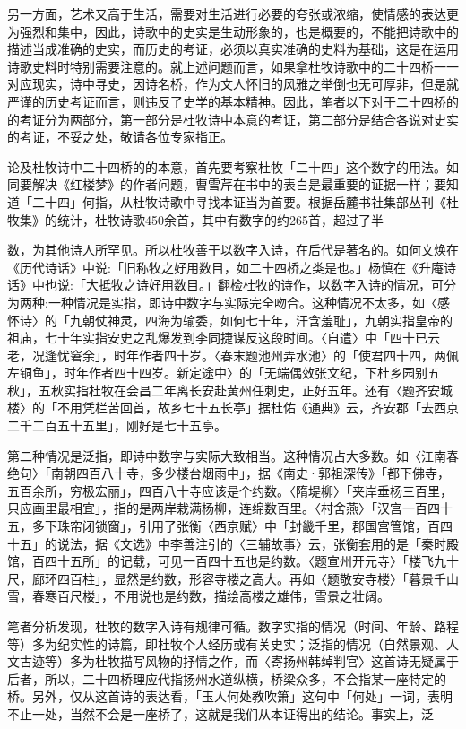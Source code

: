 另一方面，艺术又高于生活，需要对生活进行必要的夸张或浓缩，使情感的表达更为强烈和集中，因此，诗歌中的史实是生动形象的，也是概要的，不能把诗歌中的描述当成准确的史实，而历史的考证，必须以真实准确的史料为基础，这是在运用诗歌史料时特别需要注意的。就上述问题而言，如果拿杜牧诗歌中的二十四桥一一对应现实，诗中寻史，因诗名桥，作为文人怀旧的风雅之举倒也无可厚非，但是就严谨的历史考证而言，则违反了史学的基本精神。因此，笔者以下对于二十四桥的的考证分为两部分，第一部分是杜牧诗中本意的考证，第二部分是结合各说对史实的考证，不妥之处，敬请各位专家指正。


论及杜牧诗中二十四桥的的本意，首先要考察杜牧「二十四」这个数字的用法。如同要解决《红楼梦》的作者问题，曹雪芹在书中的表白是最重要的证据一样；要知道「二十四」何指，从杜牧诗歌中寻找本证当为首要。根据岳麓书社集部丛刊《杜牧集》的统计，杜牧诗歌450余首，其中有数字的约265首，超过了半


\noindent 数，为其他诗人所罕见。所以杜牧善于以数字入诗，在后代是著名的。如何文焕在《历代诗话》中说:「旧称牧之好用数目，如二十四桥之类是也。」杨慎在《升庵诗话》中也说:「大抵牧之诗好用数目。」翻检杜牧的诗作，以数字入诗的情况，可分为两种:一种情况是实指，即诗中数字与实际完全吻合。这种情况不太多，如〈感怀诗〉的「九朝仗神灵，四海为输委，如何七十年，汗含羞耻」，九朝实指皇帝的祖庙，七十年实指安史之乱爆发到李同捷谋反这段时间。〈自遣〉中「四十已云老，况逢忧窘余」，时年作者四十岁。〈春末题池州弄水池〉的「使君四十四，两佩左铜鱼」，时年作者四十四岁。新定途中〉的「无端偶效张文纪，下杜乡园别五秋」，五秋实指杜牧在会昌二年离长安赴黄州任刺史，正好五年。还有〈题齐安城楼〉的「不用凭栏苦回首，故乡七十五长亭」据杜佑《通典》云，齐安郡「去西京二千二百五十五里」，刚好是七十五亭。

第二种情况是泛指，即诗中数字与实际大致相当。这种情况占大多数。如〈江南春绝句〉「南朝四百八十寺，多少楼台烟雨中」，据《南史·郭祖深传》「都下佛寺，五百余所，穷极宏丽」，四百八十寺应该是个约数。〈隋堤柳〉「夹岸垂杨三百里，只应画里最相宜」，指的是两岸栽满杨柳，连绵数百里。〈村舍燕〉「汉宫一百四十五，多下珠帘闭锁窗」，引用了张衡〈西京赋〉中「封畿千里，郡国宫管馆，百四十五」的说法，据《文选》中李善注引的〈三辅故事〉云，张衡套用的是「秦时殿馆，百四十五所」的记载，可见一百四十五也是约数。〈题宣州开元寺〉「楼飞九十尺，廊环四百柱」，显然是约数，形容寺楼之高大。再如〈题敬安寺楼〉「暮景千山雪，春寒百尺楼」，不用说也是约数，描绘高楼之雄伟，雪景之壮阔。

笔者分析发现，杜牧的数字入诗有规律可循。数字实指的情况（时间、年龄、路程等）多为纪实性的诗篇，即杜牧个人经历或有关史实；泛指的情况（自然景观、人文古迹等）多为杜牧描写风物的抒情之作，而〈寄扬州韩绰判官〉这首诗无疑属于后者，所以，二十四桥理应代指扬州水道纵横，桥梁众多，不会指某一座特定的桥。另外，仅从这首诗的表达看，「玉人何处教吹箫」这句中「何处」一词，表明不止一处，当然不会是一座桥了，这就是我们从本证得出的结论。事实上，泛



